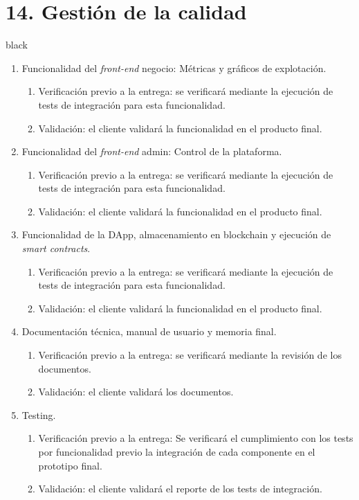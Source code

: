 \documentclass[
11pt, %
]{charter}
\begin{document}
\section{14. Gestión de la calidad}
\label{sec:calidad}
\begin{consigna}{black}
\begin{enumerate}
		\item Funcionalidad del \textit{front-end} negocio: Métricas y gráficos de explotación.
		\begin{enumerate}				
			\item Verificación previo a la entrega: se verificará mediante la ejecución de tests de integración para esta funcionalidad.	
			\item Validación: el cliente validará la funcionalidad en el producto final.			
		\end{enumerate}		
		
		\item Funcionalidad del \textit{front-end} admin: Control de la plataforma.
		\begin{enumerate}				
			\item Verificación previo a la entrega: se verificará mediante la ejecución de tests de integración para esta funcionalidad.	
			\item Validación: el cliente validará la funcionalidad en el producto final.			
		\end{enumerate}		
	
		\item Funcionalidad de la DApp, almacenamiento en blockchain y ejecución de \textit{smart contracts}.
		\begin{enumerate}				
			\item Verificación previo a la entrega: se verificará mediante la ejecución de tests de integración para esta funcionalidad.	
			\item Validación: el cliente validará la funcionalidad en el producto final.			
		\end{enumerate}			
	
		\item Documentación técnica, manual de usuario y memoria final.
		\begin{enumerate}				
			\item Verificación previo a la entrega: se verificará mediante la revisión de los documentos.			
			\item Validación: el cliente validará los documentos.			
		\end{enumerate}			
		
		\item Testing.
		\begin{enumerate}				
			\item Verificación previo a la entrega: Se verificará el cumplimiento con los tests por funcionalidad previo la integración de cada componente en el prototipo final.
			\item Validación: el cliente validará el reporte de los tests de integración.
		\end{enumerate}			
		
		
\end{enumerate}


\end{consigna}
\end{document}
